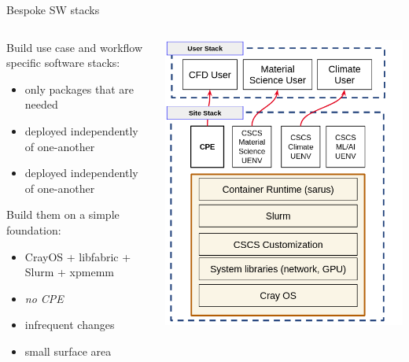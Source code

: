 \documentclass[aspectratio=43]{beamer}
\begin{document}
\begin{frame}[fragile]{Bespoke SW stacks}
    \begin{columns}[T]
        \begin{column}{0.5\textwidth}

            Build use case and workflow specific software stacks:
            \begin{itemize}
                \item only packages that are needed
                \item deployed independently of one-another
                \item deployed independently of one-another
            \end{itemize}

            Build them on a simple foundation:
            \begin{itemize}
                \item CrayOS + libfabric + Slurm + xpmemm
                \item \emph{no CPE}
                \item infrequent changes
                \item small surface area
            \end{itemize}


        \end{column}
        \begin{column}{0.5\textwidth}
            \includegraphics[width=\textwidth]{images/stack-new.png}
        \end{column}
    \end{columns}
\end{frame}
\end{document}
